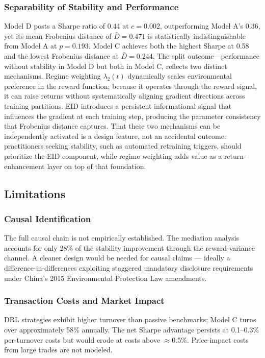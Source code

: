\documentclass[12pt]{article}
\begin{document}
\subsubsection*{Separability of Stability and Performance}
Model D posts a Sharpe ratio of 0.44 at $c=0.002$, outperforming
Model A's 0.36, yet its mean Frobenius distance of $\bar{D}=0.471$
is statistically indistinguishable from Model A at $p=0.193$. Model C
achieves both the highest Sharpe at 0.58 and the lowest Frobenius
distance at $\bar{D}=0.244$. The split outcome---performance without
stability in Model D but both in Model C, reflects two distinct
mechanisms. Regime weighting $\lambda_2(t)$ dynamically scales
environmental preference in the reward function; because it operates
through the reward signal, it can raise returns without systematically
aligning gradient directions across training partitions. EID
introduces a persistent informational signal that influences the
gradient at each training step, producing the parameter consistency
that Frobenius distance captures. That these two mechanisms can be
independently activated is a design feature, not an accidental
outcome: practitioners seeking stability, such as automated retraining triggers, should prioritize the EID component, while regime weighting adds value as a return-enhancement layer on top of that foundation.

\subsection{Limitations}

\subsubsection*{Causal Identification}
The full causal chain is not empirically established. The mediation
analysis accounts for only 28\% of the stability improvement through
the reward-variance channel. A cleaner design would be needed for causal claims --- ideally a
difference-in-differences exploiting staggered mandatory disclosure
requirements under China's 2015 Environmental Protection Law
amendments.

\subsubsection*{Transaction Costs and Market Impact}
DRL strategies exhibit higher turnover than passive benchmarks; Model C
turns over approximately 58\% annually. The net Sharpe advantage persists at 0.1--0.3\%
per-turnover costs but would erode at costs above $\approx$0.5\%.
Price-impact costs from large trades are not modeled.
\end{document}
